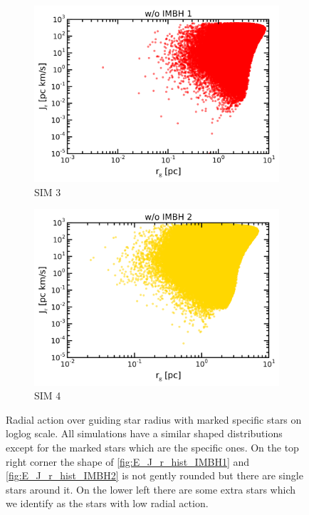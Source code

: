 \begin{figure}
\begin{subfigure}{0.475\textwidth}
		\includegraphics[width=\textwidth]{Plots/r_g_J_r_noIMBH1.png}
		\caption{SIM 3}
		\label{fig:r_g_J_r_noIMBH1}
	\end{subfigure}
	\hfill
	\begin{subfigure}{0.475\textwidth}
		\centering
		\includegraphics[width=\textwidth]{Plots/r_g_J_r_noIMBH2.png}
		\caption{SIM 4}
		\label{fig:r_g_J_r_noIMBH2}
	\end{subfigure}
	\caption{Radial action over guiding star radius with marked specific stars on loglog scale. All simulations have a similar shaped distributions except for the marked stars which are the specific ones. On the top right corner the shape of \ref{fig:E_J_r_hist_IMBH1} and \ref{fig:E_J_r_hist_IMBH2} is not gently rounded but there are single stars around it. On the lower left there are some extra stars which we identify as the stars with low radial action.}
	\label{fig:r_g_J_r}
\end{figure}
